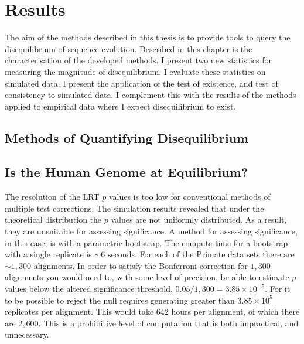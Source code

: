 \chapter{Results}

The aim of the methods described in this thesis is to provide tools to query the disequilibrium of sequence evolution. Described in this chapter is the characterisation of the developed methods. I present two new statistics for measuring the magnitude of disequilibrium. I evaluate these statistics on simulated data. I present the application of the test of existence, and test of consistency to simulated data. I complement this with the results of the methods applied to empirical data where I expect disequilibrium to exist.

\section{Methods of Quantifying Disequilibrium}






\section{Is the Human Genome at Equilibrium?}




The resolution of the LRT $p$ values is too low for conventional methods of multiple test corrections. The simulation results revealed that under the theoretical distribution the $p$ values are not uniformly distributed. As a result, they are unsuitable for assessing significance. A method for assessing significance, in this case, is with a parametric bootstrap. The compute time for a bootstrap with a single replicate is ${\sim} 6$ seconds. For each of the Primate data sets there are ${\sim} 1,300$ alignments. In order to satisfy the Bonferroni correction for $1,300$ alignments you would need to, with some level of precision, be able to estimate $p$ values below the altered significance threshold, $0.05/1,300 = 3.85{\times}10^{-5}$. For it to be possible to reject the null requires generating greater than $3.85{\times}10^{5}$ replicates per alignment. This would take $642$ hours per alignment, of which there are $2,600$. This is a prohibitive level of computation that is both impractical, and unnecessary. 

